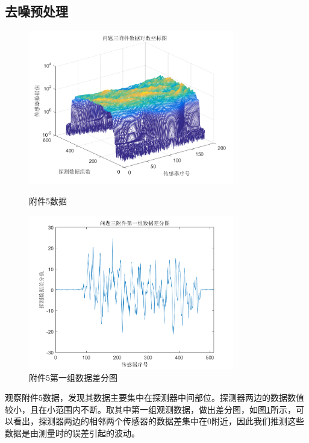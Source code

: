 \documentclass{myart}
\begin{document}
\subsection{去噪预处理}
 \begin{figure}[H]
		 \begin{minipage}[H]{0.5\textwidth}
		 \centering
		 \includegraphics[width=0.8\textwidth]{./pic/fujian5.png}
		 \caption{附件5数据}
		 \end{minipage}
		 \begin{minipage}[H]{0.5\textwidth}
		 \centering
		 \includegraphics[width=0.8\textwidth]{./pic/fujian5_1.png}
		 \caption{附件5第一组数据差分图}
		 \label{chafen}
		 \end{minipage}
\end{figure}
观察附件5数据，发现其数据主要集中在探测器中间部位。探测器两边的数据数值较小，且在小范围内不断。取其中第一组观测数据，做出差分图，如图\ref{chafen}所示，可以看出，探测器两边的相邻两个传感器的数据差集中在0附近，因此我们推测这些数据是由测量时的误差引起的波动。
\end{document}
